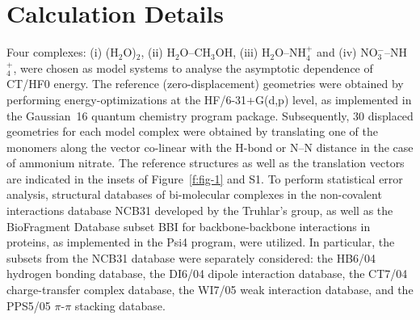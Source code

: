 \documentclass[aip,jcp,amsmath,amssymb,reprint,floatfix]{revtex4-1}
\begin{document}
\section{\label{s:4.calculations}Calculation Details}

Four complexes: 
(i) (H$_2$O)$_2$, 
(ii) H$_2$O--CH$_3$OH, 
(iii) H$_2$O--NH$_4^+$ and 
(iv) NO$_3^-$--NH$_4^+$,
were chosen as model systems to analyse the asymptotic dependence 
of CT/HF0 energy. 
The reference (zero\hyp{}displacement) geometries
were obtained by
performing energy\hyp{}optimizations at the HF/6-31+G(d,p) level,
as implemented in 
the {\sc Gaussian~16} quantum chemistry program package.\cite{Gaussian16}
Subsequently, 30 displaced geometries for each model complex
were obtained by translating one of the monomers along the vector 
co\hyp{}linear with the H-bond or N--N distance in the case of ammonium nitrate.
The reference structures as well as the translation vectors are
indicated in the insets of Figure~\ref{f:fig-1} and S1.
To perform statistical error analysis, structural databases
of bi\hyp{}molecular complexes in the non\hyp{}covalent
interactions database NCB31 developed by the Truhlar's 
group,\cite{Zhao.Schultz.Truhlar.JCTC.2006,
Zhao.Truhlar.JCTC.2005,Zhao.Schultz.Truhlar.JCTC.2006,Zhao.Schultz.Truhlar.JCP.2005}
as well as the BioFragment Database subset BBI for backbone\hyp{}backbone
interactions in proteins,\cite{Burns.Faver.Zheng.Marshall.Smith.Vanommeslaeghe.MacKerell.Merz.Sherrill.JCP.2017} 
as implemented in the {\sc Psi4}
program,\cite{Psi4.JCTC.2017}
were utilized.
In particular, the subsets from the NCB31 database were separately considered:
the HB6/04 hydrogen bonding database,\cite{Zhao.Truhlar.JCTC.2005,Zhao.Schultz.Truhlar.JCTC.2006,Zhao.Schultz.Truhlar.JCP.2005}
the DI6/04 dipole interaction database,\cite{Zhao.Truhlar.JCTC.2005,Zhao.Schultz.Truhlar.JCTC.2006,Zhao.Schultz.Truhlar.JCP.2005}
the CT7/04 charge-transfer complex database,\cite{Zhao.Truhlar.JCTC.2005,Zhao.Schultz.Truhlar.JCTC.2006,Zhao.Schultz.Truhlar.JCP.2005}
the WI7/05 weak interaction database,\cite{Zhao.Schultz.Truhlar.JCTC.2006,Zhao.Schultz.Truhlar.JCP.2005,Zhao.Truhlar.JPCA.2005}
and 
the PPS5/05 $\pi$-$\pi$ stacking database.\cite{Zhao.Schultz.Truhlar.JCTC.2006,Zhao.Schultz.Truhlar.JCP.2005,Zhao.Truhlar.JPCA.2005}
\end{document}
